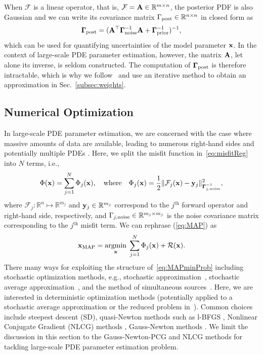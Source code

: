 \documentclass[11pt]{article}          %
\DeclareMathOperator*{\argmin}{argmin}
\newcommand{\hf}{\frac12}
\newcommand{\bbR}{\mathbb{R}}
\newcommand{\bfA}{{\bf A}}
\newcommand{\bfy}{{\bf  y}}
\newcommand{\bfx}{{\bf  x}}
\newcommand{\bfGamma}{\boldsymbol{\Gamma}}
\begin{document}
When $\mathcal{F}$ is a linear operator, that is, $\mathcal{F} = \bfA \in \bbR^{m \times n}$, the posterior PDF is also Gaussian and we can write its covariance matrix $\Gamma_{\rm post} \in \bbR^{n \times n}$ in closed form as
\begin{align}
\label{eq:postCovIntractable}
  \boldsymbol{\Gamma}_{\rm post} = (\bfA^\top \boldsymbol{\Gamma}_{\rm noise}^{-1} \bfA + \boldsymbol{\Gamma}_{\rm prior}^{-1})^{-1},
\end{align}
which can be used for quantifying uncertainties of the model parameter $\bfx$. In the context of large-scale PDE parameter estimation, however, the matrix $\bfA$, let alone its inverse, is seldom constructed. The computation of $\bfGamma_{\rm{post}}$ is therefore intractable, which is why we follow~\cite{flath2011fast} and use an iterative method to obtain an approximation in Sec.~\ref{subsec:weights}.

\subsection{Numerical Optimization}
\label{subsec:parallelGaussNewton}
In large-scale PDE parameter estimation, we are concerned with the case where massive amounts of data are available, leading to numerous right-hand sides and potentially multiple PDEs \cite{treister2016fast, haber2013model}. Here, we split the misfit function in~\eqref{eq:misfitReg} into $N$ terms, i.e.,
\begin{equation}
  \Phi(\bfx) = \sum_{j=1}^N \Phi_j(\bfx), \quad\text{where}\quad \Phi_j(\bfx)   = \hf \| \mathcal{F}_j (\bfx) - \bfy_j \|_{\boldsymbol{\Gamma}_{j, \rm noise}^{-1}}^2,
\end{equation}
where $\mathcal{F}_j \colon \bbR^{n} \mapsto \bbR^{m_j}$ and $ \bfy_j \in \bbR^{m_j}$ correspond to the $j^{\text{th}}$ forward operator and right-hand side, respectively, and $\Gamma_{j, \rm noise} \in \bbR^{m_j \times m_j}$ is the noise covariance matrix corresponding to the $j^{\text{th}}$ misfit term.  We can rephrase (\ref{eq:MAP}) as
\begin{equation}
  \begin{split}
    \label{eq:MAPminProb}
    \bfx_{\rm MAP} = \argmin_\bfx \; \sum_{j=1}^N \Phi_j(\bfx) + \mathcal{R}(\bfx).
    \end{split}
\end{equation}
There many ways for exploiting the structure of~\eqref{eq:MAPminProb} including stochastic optimization methods, e.g., stochastic approximation~\cite{RobbinsMonro1951}, stochastic average approximation~\cite{KleywegtEtAl2006}, and the method of simultaneous sources~\cite{HaberChungHerrmann2012}.
Here, we are interested in deterministic optimization methods (potentially applied to a stochastic average approximation or the reduced problem in~\cite{HaberChungHerrmann2012}). Common choices include steepest descent (SD), quasi-Newton methods such as l-BFGS \cite{wright1999numerical}, Nonlinear Conjugate Gradient \break(NLCG) methods \cite{hager2006survey,hager2005new}, Gauss-Newton methods \cite{haber2014computational,wright1999numerical}. We limit the discussion in this section to the Gauss-Newton-PCG and NLCG methods for tackling large-scale PDE parameter estimation problem.
\end{document}
